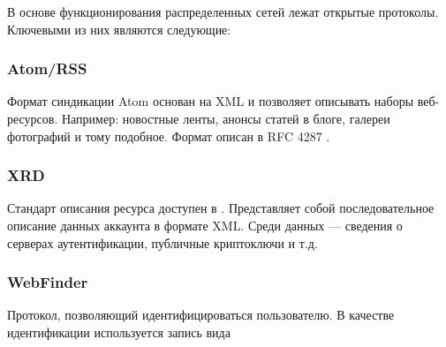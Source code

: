\documentclass[10pt, a5paper]{article}
\begin{document}
 В основе функционирования распределенных сетей лежат открытые протоколы.
 Ключевыми из них являются следующие:

 \subsubsection*{Atom/RSS}
 \begin{figure}[ht]
\end{figure}

    Формат синдикации Atom основан на XML и позволяет описывать наборы
    веб-ресурсов. Например: новостные ленты, анонсы статей в блоге,
    галереи фотографий и тому подобное. Формат описан в RFC 4287 \cite{zag2}.

    \subsubsection*{XRD}
 Стандарт описания ресурса доступен в \cite{zag3}. Представляет собой
    последовательное описание данных аккаунта в формате XML. Среди
    данных --- сведения о серверах аутентификации, публичные криптоключи и т.д.

    \subsubsection*{WebFinder}
 \begin{figure}[ht]
\end{figure}
    Протокол, позволяющий идентифицироваться пользователю. В качестве
    идентификации используется запись вида 
    
\end{document}
